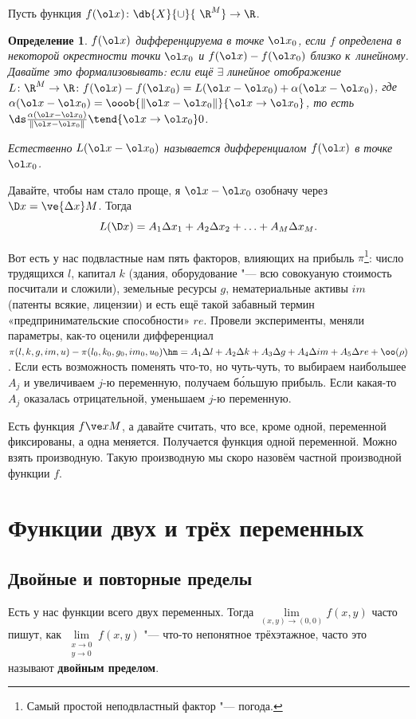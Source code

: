 \documentclass[a4paper,10pt,twoside]{article}
\newtheorem{Def}{Определение}[section]
\let\AVsection\section{}
\renewcommand\section{\newpage\scol\AVsection}
\newcommand{\scol}{  \renewcommand{\headrulewidth}{0.5pt}\fancyhead[RE,LO]{\thesection{} \leftmark} \fancyhead[LE,RO]{\thepage}}
\begin{document}
	 Пусть функция $f(\ol x)\colon \db{X}{\cup}{ \ \R^M}\to \R$.
	 \begin{Def}\label{DIFF}
	 $f(\ol x)$ дифференцируема в точке $\ol x_0$, если $f$ определена в некоторой окрестности точки $\ol x_0$ и
	 $f(\ol x) - f(\ol x_0)$ близко к~линейному. Давайте это формализовывать:
	 если ещё $\exists$ линейное отображение $L\colon \R^M\to \R\colon f(\ol x) - f(\ol x_0) = L(\ol x - \ol x_0) + \alpha (\ol x - \ol x_0)$,
	 где $\alpha(\ol x- \ol x_0) = \ooob{\|\ol x - \ol x_0\|}{\ol x\to \ol x_0}$, то есть $\ds\frac{\alpha(\ol x- \ol x_0)}{\|\ol x - \ol x_0\|}\tend{\ol x\to \ol x_0}0$.
	 
	 Естественно $L(\ol x - \ol x_0)$ называется дифференциалом $f(\ol x)$ в точке $\ol x_0$. 
	 \end{Def}
	 Давайте, чтобы нам стало проще, я $\ol x - \ol x_0$ озобначу через $\D x = \ve {\Delta x}M$.
	 Тогда \[L(\D x)=A_1\Delta x_1+A_2\Delta x_2+\ldots+A_M\Delta x_M.\]
	 
	 Вот есть у нас подвластные нам пять факторов, влияющих на прибыль $\pi$\footnote{Самый простой неподвластный фактор "--- погода.}: число трудящихся $l$, капитал $k$ (здания, оборудование "--- всю совокуаную стоимость посчитали и сложили),
	 земельные ресурсы $g$, нематериальные активы $im$ (патенты всякие, лицензии) и есть ещё такой забавный термин «предпринимательские способности» $re$.
	 Провели эксперименты, меняли параметры, как-то оценили дифференциал $\pi (l,k,g,im,u) - \pi(l_0,k_0,g_0,im_0,u_0) \hm= A_1\Delta l + A_2 \Delta k+ A_3 \Delta g+A_4\Delta im+ A_5\Delta re + \oo(\rho)$.
	 Если есть возможность поменять что-то, но чуть-чуть, то выбираем наибольшее $A_j$ и увеличиваем $j$-ю переменную, получаем б\'{о}льшую прибыль.
	 Если какая-то $A_j$ оказалась отрицательной, уменьшаем $j$-ю переменную.  
	 
	 Есть функция $f\ve xM$, а давайте считать, что все, кроме одной, переменной фиксированы, а одна меняется. Получается функция одной переменной.
	 Можно взять производную. Такую производную мы скоро назовём частной производной функции $f$.
	 \section{Функции двух и трёх переменных}
	 \subsection{Двойные и повторные пределы}
	 Есть у нас функции всего двух переменных. Тогда $\lim\limits_{(x,y)\to(0,0)}f(x,y)$ часто пишут, как $\lim\limits_{\substack{x\to 0\\ y\to 0}}f(x,y)$ "---
	 что-то непонятное трёхэтажное, часто это называют \textbf{двойным пределом}.
	 
\end{document}
